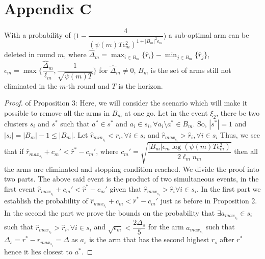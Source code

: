 \section*{Appendix C}
\begin{proposition}
With a probability of $\bigg(1-\dfrac{4}{(\psi(m)T\epsilon_{m}^{2})^{1+|B_{m}|^{2}\epsilon_{m}}}\bigg)$ a sub-optimal arm can be deleted in round $m$, where $\hat{\Delta}_{m}=\max_{i\in B_{m}}{\lbrace\hat{r}_{i}\rbrace}-\min_{j\in B_{m}}{\lbrace\hat{r}_{j}\rbrace}$,  $\epsilon_{m}=\max{\bigg\lbrace\dfrac{\hat{\Delta}_{m}}{\ell_{m}}, \dfrac{1}{\sqrt{\psi{(m)T}}}\bigg\rbrace}$ for $\hat{\Delta}_{m}\neq 0$, $B_{m}$ is the set of arms still not eliminated in the $m$-th round and $T$ is the horizon.
\end{proposition}

\begin{proof} of Proposition 3:
\newline
Here, we will consider the scenario which will make it possible to remove all the arms in $B_{m}$ at one go. Let in the event $\xi_{2}$, there be two clusters $s_{i}$ and $s^{*}$ such that $a^{*}\in s^{*}$ and $a_{i}\in s_{i}, \forall a_{i}\setminus a^{*}\in B_{m}$. So, $|s^{*}|=1$ and $|s_{i}|=|B_{m}|-1\leq |B_{m}|$. Let $\hat{r}_{min_{s_{i}}}<\hat{r}_{i},\forall i\in s_{i}$ and $\hat{r}_{max_{s_{i}}}>\hat{r}_{i},\forall i\in s_{i}$ Thus, we see that if
\newline
\hspace*{2em} $\hat{r}_{max_{s_{i}}}+c_{m}' < \hat{r}^{*}-c_{m}' $, where $c_{m}'=\sqrt{\dfrac{|B_{m}|\epsilon_{m}\log{(\psi(m)T\epsilon_{m}^{2})}}{2\ell_{m} n_{m}}}$
\newline
then all the arms are eliminated and stopping condition reached. 
We divide the proof into two parts. The above said event is the product of two simultaneous events, in the first event $\hat{r}_{max_{s_{i}}}+c_{m}' < \hat{r}^{*}-c_{m}'$ given that $\hat{r}_{max_{s_{i}}}>\hat{r}_{i}\forall i \in s_{i}$. In the first part we establish the probability of $\hat{r}_{max_{s_{i}}}+c_{m} < \hat{r}^{*}-c_{m}'$ just as before in Proposition 2. In the second the part we prove the bounds on the probability that $\exists a_{max_{s_{i}}}\in s_{i}$ such that $\hat{r}_{max_{s_{i}}}>\hat{r}_{i},\forall i \in s_{i}$ and $\sqrt{\epsilon_{m}}<\dfrac{2\Delta_{s}}{5}$ for the arm $a_{max_{s_{i}}}$ such that $\Delta_{s}=r^{*}-r_{max_{s_{i}}}=\Delta$ as $a_{s}$ is the arm that has the second highest $r_{s}$ after $r^{*}$ hence it lies closest to $a^{*}$.

\end{proof}
